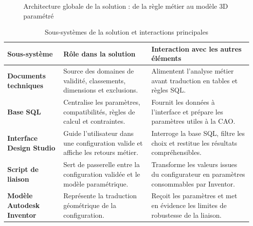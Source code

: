 \begin{figure}[H]
\centering
{}
\caption{Architecture globale de la solution : de la règle métier au modèle 3D paramétré}
\label{fig:archi-globale}
\end{figure}

\begin{table}[H]
\centering
\caption{Sous-systèmes de la solution et interactions principales}
\begin{tabularx}{\textwidth}{>{\bfseries}p{}X X}
\toprule
Sous-système & Rôle dans la solution & Interaction avec les autres éléments \\
\midrule
Documents techniques & Source des domaines de validité, classements, dimensions et exclusions. & Alimentent l'analyse métier avant traduction en tables et règles SQL. \\
Base SQL & Centralise les paramètres, compatibilités, règles de calcul et contraintes. & Fournit les données à l'interface et prépare les paramètres utiles à la CAO. \\
Interface Design Studio & Guide l'utilisateur dans une configuration valide et affiche les retours métier. & Interroge la base SQL, filtre les choix et restitue les résultats compréhensibles. \\
Script de liaison & Sert de passerelle entre la configuration validée et le modèle paramétrique. & Transforme les valeurs issues du configurateur en paramètres consommables par Inventor. \\
Modèle Autodesk Inventor & Représente la traduction géométrique de la configuration. & Reçoit les paramètres et met en évidence les limites de robustesse de la liaison. \\
\bottomrule
\end{tabularx}
\end{table}

